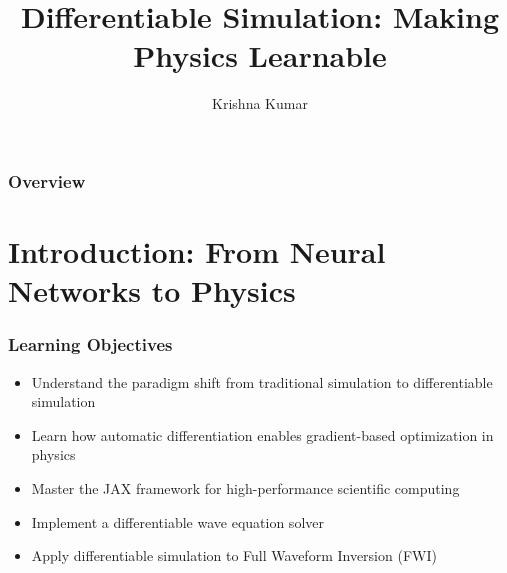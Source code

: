 \documentclass[notes]{beamer}
\title[Differentiable Simulation]{Differentiable Simulation: Making Physics Learnable}
\author{Krishna Kumar} %
\institute[UT Austin] %
{
University of Texas at Austin \\
\medskip
\textit{
  \url{krishnak@utexas.edu}} %
}
\date{} %
\begin{document}
\begin{frame}
\titlepage %
\end{frame}

\begin{frame}
 \frametitle{Overview}
 \tableofcontents
\end{frame}


\section{Introduction: From Neural Networks to Physics}

\begin{frame}
\frametitle{Learning Objectives}

\begin{itemize}
    \item Understand the paradigm shift from traditional simulation to differentiable simulation
    \item Learn how automatic differentiation enables gradient-based optimization in physics
    \item Master the JAX framework for high-performance scientific computing
    \item Implement a differentiable wave equation solver
    \item Apply differentiable simulation to Full Waveform Inversion (FWI)
\end{itemize}

\vspace{1cm}
\centering
\href{https://colab.research.google.com/github/kks32-courses/sciml/blob/main/lectures/03-diffsim/03-diffsim.ipynb}{}

\end{frame}
\end{document}
